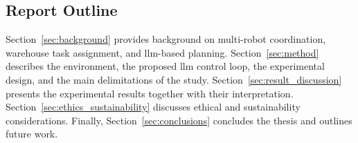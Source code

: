 \subsection{Report Outline}
Section~\ref{sec:background} provides background on multi-robot coordination, warehouse task assignment, and \gls{llm}-based planning.
Section~\ref{sec:method} describes the environment, the proposed \gls{llm} control loop, the experimental design, and the main delimitations of the study.
Section~\ref{sec:result_discussion} presents the experimental results together with their interpretation.
Section~\ref{sec:ethics_sustainability} discusses ethical and sustainability considerations.
Finally, Section~\ref{sec:conclusions} concludes the thesis and outlines future work.
